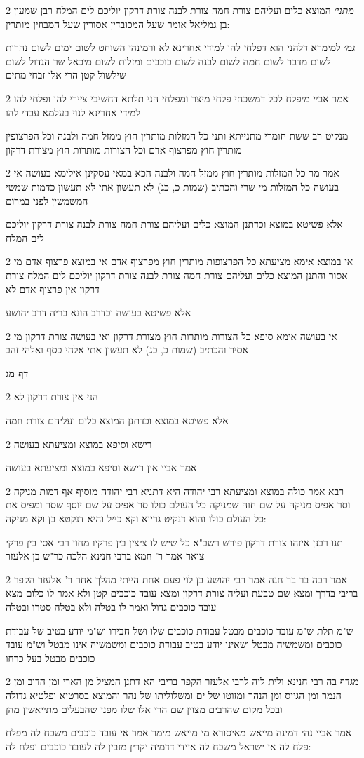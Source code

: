 \documentclass[12pt, openany]{book}
\newcommand{\sethebfont}{
\fontsize{10.5pt}{21.0pt} \selectfont
}
\newcommand{\twocol}[1]{
	{\sethebfont \begin{multicols}{2}
			#1
	\end{multicols}}	
}
\newcommand{\sectname}{}
\newcommand{\newsection}[1]{
	\addcontentsline{toc}{section}{#1}
	\renewcommand{\sectname}{#1}	
	\vspace{-\baselineskip}
	\begin{center}
		\textbf{%
\fontsize{16pt}{16pt}\selectfont
			#1}
	\end{center}
	\vspace{-\baselineskip}
	\nopagebreak
}
\begin{document}
\twocol{{\large\emph{מתני׳}} המוצא כלים ועליהם צורת חמה צורת לבנה צורת דרקון יוליכם לים המלח רבן שמעון בן גמליאל אומר שעל המכובדין אסורין שעל המבוזין מותרין:
\par {\large\emph{גמ׳}} למימרא דלהני הוא דפלחי להו למידי אחרינא לא ורמינהי השוחט לשום ימים לשום נהרות לשום מדבר לשום חמה לשום לבנה לשום כוכבים ומזלות לשום מיכאל שר הגדול לשום שילשול קטן הרי אלו זבחי מתים}
\twocol{אמר אביי מיפלח לכל דמשכחי פלחי מיצר ומפלחי הני תלתא דחשיבי ציירי להו ופלחי להו למידי אחרינא לנוי בעלמא עבדי להו
\par מנקיט רב ששת חומרי מתנייתא ותני כל המזלות מותרין חוץ ממזל חמה ולבנה וכל הפרצופין מותרין חוץ מפרצוף אדם וכל הצורות מותרות חוץ מצורת דרקון}
\twocol{אמר מר כל המזלות מותרין חוץ ממזל חמה ולבנה הכא במאי עסקינן אילימא בעושה אי בעושה כל המזלות מי שרי והכתיב (שמות כ, כג) לא תעשון אתי לא תעשון כדמות שמשי המשמשין לפני במרום
\par אלא פשיטא במוצא וכדתנן המוצא כלים ועליהם צורת חמה צורת לבנה צורת דרקון יוליכם לים המלח}
\twocol{אי במוצא אימא מציעתא כל הפרצופות מותרין חוץ מפרצוף אדם אי במוצא פרצוף אדם מי אסור והתנן המוצא כלים ועליהם צורת חמה צורת לבנה צורת דרקון יוליכם לים המלח צורת דרקון אין פרצוף אדם לא
\par אלא פשיטא בעושה וכדרב הונא בריה דרב יהושע}
\twocol{אי בעושה אימא סיפא כל הצורות מותרות חוץ מצורת דרקון ואי בעושה צורת דרקון מי אסיר והכתיב (שמות כ, כג) לא תעשון אתי אלהי כסף ואלהי זהב}
\newsection{דף מג}
\twocol{הני אין צורת דרקון לא
\par אלא פשיטא במוצא וכדתנן המוצא כלים ועליהם צורת חמה}
\twocol{רישא וסיפא במוצא ומציעתא בעושה
\par אמר אביי אין רישא וסיפא במוצא ומציעתא בעושה}
\twocol{רבא אמר כולה במוצא ומציעתא רבי יהודה היא דתניא רבי יהודה מוסיף אף דמות מניקה וסר אפיס מניקה על שם חוה שמניקה כל העולם כולו סר אפיס על שם יוסף שסר ומפיס את כל העולם כולו והוא דנקיט גריוא וקא כייל והיא דנקטא בן וקא מניקה:
\par תנו רבנן איזהו צורת דרקון פירש רשב"א כל שיש לו ציצין בין פרקיו מחוי רבי אסי בין פרקי צואר אמר ר' חמא ברבי חנינא הלכה כר"ש בן אלעזר}
\twocol{אמר רבה בר בר חנה אמר רבי יהושע בן לוי פעם אחת הייתי מהלך אחר ר' אלעזר הקפר בריבי בדרך ומצא שם טבעת ועליה צורת דרקון ומצא עובד כוכבים קטן ולא אמר לו כלום מצא עובד כוכבים גדול ואמר לו בטלה ולא בטלה סטרו ובטלה
\par ש"מ תלת ש"מ עובד כוכבים מבטל עבודת כוכבים שלו ושל חבירו וש"מ יודע בטיב של עבודת כוכבים ומשמשיה מבטל ושאינו יודע בטיב עבודת כוכבים ומשמשיה אינו מבטל וש"מ עובד כוכבים מבטל בעל כרחו}
\twocol{מגדף בה רבי חנינא ולית ליה לרבי אלעזר הקפר בריבי הא דתנן המציל מן הארי ומן הדוב ומן הנמר ומן הגייס ומן הנהר ומזוטו של ים ומשלוליתו של נהר והמוצא בסרטיא ופלטיא גדולה ובכל מקום שהרבים מצוין שם הרי אלו שלו מפני שהבעלים מתייאשין מהן
\par אמר אביי נהי דמינה מייאש מאיסורא מי מייאש מימר אמר אי עובד כוכבים משכח לה מפלח פלח לה אי ישראל משכח לה איידי דדמיה יקרין מזבין לה לעובד כוכבים ופלח לה:}
\end{document}
